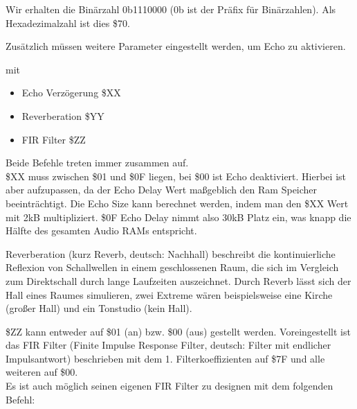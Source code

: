Wir erhalten die Binärzahl 0b1110000 (0b ist der Präfix für Binärzahlen). Als Hexadezimalzahl ist dies \$70.

\bigskip

Zusätzlich müssen weitere Parameter eingestellt werden, um Echo zu aktivieren.

\medskip



\medskip

mit

\begin{itemize}
	\item Echo Verzögerung \$XX
	\item Reverberation \$YY
	\item FIR Filter \$ZZ
\end{itemize}

Beide Befehle treten immer zusammen auf. \\

\$XX muss zwischen \$01 und \$0F liegen, bei \$00 ist Echo deaktiviert. Hierbei ist aber aufzupassen, da der Echo Delay Wert maßgeblich den Ram Speicher beeinträchtigt. Die Echo Size kann berechnet werden, indem man den \$XX Wert mit 2kB multipliziert. \$0F Echo Delay nimmt also 30kB Platz ein, was knapp die Hälfte des gesamten Audio RAMs entspricht.

\bigskip

Reverberation (kurz Reverb, deutsch: Nachhall) beschreibt die kontinuierliche Reflexion von Schallwellen in einem geschlossenen Raum, die sich im Vergleich zum Direktschall durch lange Laufzeiten auszeichnet. Durch Reverb lässt sich der Hall eines Raumes simulieren, zwei Extreme wären beispielsweise eine Kirche (großer Hall) und ein Tonstudio (kein Hall).

\bigskip

\$ZZ kann entweder auf \$01 (an) bzw. \$00 (aus) gestellt werden. Voreingestellt ist das FIR Filter (Finite Impulse Response Filter, deutsch: Filter mit endlicher Impulsantwort) beschrieben mit dem 1. Filterkoeffizienten auf \$7F und alle weiteren auf \$00. \\
Es ist auch möglich seinen eigenen FIR Filter zu designen mit dem folgenden Befehl:

\medskip



